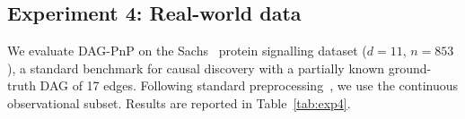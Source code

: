 \documentclass[conference]{IEEEtran}
\begin{document}
\begin{table}[ht]
  \centering
  \caption{Experiment~3: effect of sample size ($d=20$, SF4).}
  \label{tab:exp3}
  \tiny
  \setlength{\tabcolsep}{1.2pt}
  \renewcommand{\arraystretch}{0.9}
\end{table}


    \subsection{Experiment 4: Real-world data}
    \label{ssec:exp4}
    
    We evaluate DAG-PnP on the Sachs~\cite{sachs2005causal} protein
    signalling dataset ($d=11$, $n=853$), a standard benchmark for causal
    discovery with a partially known ground-truth DAG of 17 edges.
    Following standard preprocessing~\cite{zheng2018dags}, we use the
    continuous observational subset.
    Results are reported in Table~\ref{tab:exp4}.
    
\end{document}
